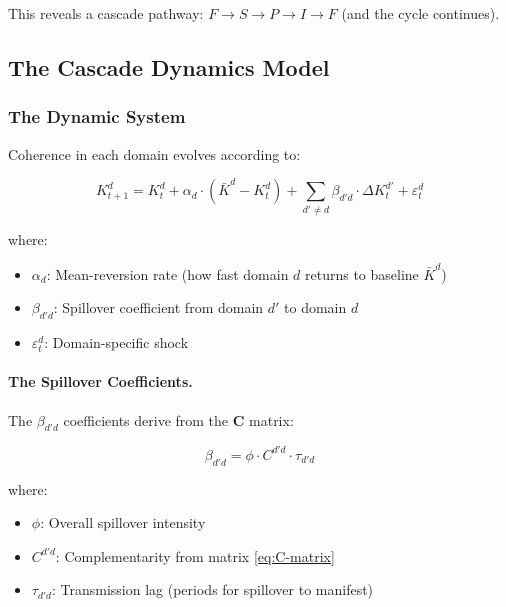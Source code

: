 This reveals a cascade pathway: $F \to S \to P \to I \to F$ (and the cycle continues).

\subsection{The Cascade Dynamics Model}

\subsubsection{The Dynamic System}

Coherence in each domain evolves according to:

\begin{equation}
K^d_{t+1} = K^d_t + \alpha_d \cdot \left(\bar{K}^d - K^d_t\right) + \sum_{d' \neq d} \beta_{d'd} \cdot \Delta K^{d'}_t + \varepsilon^d_t
\label{eq:K-dynamics}
\end{equation}

where:
\begin{itemize}
    \item $\alpha_d$: Mean-reversion rate (how fast domain $d$ returns to baseline $\bar{K}^d$)
    \item $\beta_{d'd}$: Spillover coefficient from domain $d'$ to domain $d$
    \item $\varepsilon^d_t$: Domain-specific shock
\end{itemize}

\paragraph{The Spillover Coefficients.}
The $\beta_{d'd}$ coefficients derive from the $\mathbf{C}$ matrix:

\begin{equation}
\beta_{d'd} = \phi \cdot C^{d'd} \cdot \tau_{d'd}
\end{equation}

where:
\begin{itemize}
    \item $\phi$: Overall spillover intensity
    \item $C^{d'd}$: Complementarity from matrix \eqref{eq:C-matrix}
    \item $\tau_{d'd}$: Transmission lag (periods for spillover to manifest)
\end{itemize}


